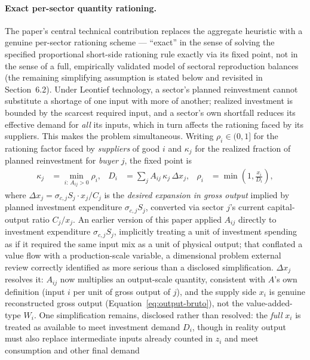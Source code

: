 \documentclass[11pt]{article}
\begin{document}
\paragraph{Exact per-sector quantity rationing.} The paper's central
technical contribution replaces the aggregate heuristic with a genuine
per-sector rationing scheme --- ``exact'' in the sense of solving the
specified proportional short-side rationing rule exactly via its fixed
point, not in the sense of a full, empirically validated model of
sectoral reproduction balances (the remaining simplifying assumption is
stated below and revisited in Section~6.2). Under Leontief technology, a sector's planned
reinvestment cannot substitute a shortage of one input with more of
another; realized investment is bounded by the scarcest required input,
and a sector's own shortfall reduces its effective demand for \emph{all}
its inputs, which in turn affects the rationing faced by its suppliers.
This makes the problem simultaneous. Writing $\rho_i\in(0,1]$ for the
rationing factor faced by \emph{suppliers} of good $i$ and $\kappa_j$ for
the realized fraction of planned reinvestment for \emph{buyer} $j$, the
fixed point is
\begin{align}
  \kappa_j &= \min_{i:\,A_{ij}>0} \rho_i, &
  D_i &= \sum_j A_{ij}\,\kappa_j\,\Delta x_j, &
  \rho_i &= \min\!\left(1, \frac{x_i}{D_i}\right), \label{eq:rationing}
\end{align}
where $\Delta x_j=\sigma_{c,j}S_j\cdot x_j/C_j$ is the \emph{desired
expansion in gross output} implied by planned investment expenditure
$\sigma_{c,j}S_j$, converted via sector $j$'s current capital-output
ratio $C_j/x_j$. An earlier version of this paper applied $A_{ij}$
directly to investment expenditure $\sigma_{c,j}S_j$, implicitly
treating a unit of investment spending as if it required the same input
mix as a unit of physical output; that conflated a value flow with a
production-scale variable, a dimensional problem external review
correctly identified as more serious than a disclosed simplification.
$\Delta x_j$ resolves it: $A_{ij}$ now multiplies an output-scale
quantity, consistent with $A$'s own definition (input $i$ per unit of
gross output of $j$), and the supply side $x_i$ is genuine reconstructed
gross output (Equation~\eqref{eq:output-bruto}), not the value-added-type
$W_i$. One simplification remains, disclosed rather than resolved: the
\emph{full} $x_i$ is treated as available to meet investment demand
$D_i$, though in reality output must also replace intermediate inputs
already counted in $z_i$ and meet consumption and other final demand
\end{document}
